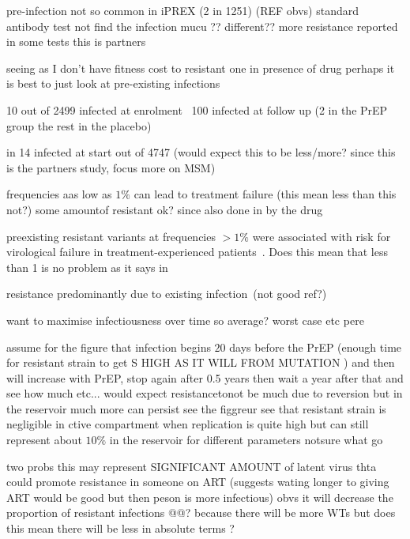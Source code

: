 \documentclass[DIV=15]{scrartcl}
\begin{document}
pre-infection not so common in iPREX (2 in 1251) (REF obvs) standard antibody test not find the infection 
mucu  ?? different??
more resistance reported in some tests \cite{lehman2015} this is partners 

seeing as I don't have fitness cost to resistant one in presence of drug perhaps it is best to just look at pre-existing infections

10 out of 2499 infected at enrolment~\cite{iprex2011}
100 infected at follow up (2 in the PrEP group the rest in the placebo)

in \cite{partners2012} 14 infected at start out of 4747 (would expect this to be less/more? since this is the partners study, focus more on MSM)

frequencies aas low as $1\%$ can lead to treatment failure (this mean less than this not?) some amountof resistant ok? since also done in by the drug

preexisting resistant
variants at frequencies $>1\%$ were associated with risk for virological
failure in treatment-experienced patients~\cite{boltz2011}. Does this mean that less than 1 is no problem as it says in~\cite{lehman2015}

resistance predominantly due to existing infection~\cite{lehman2015}(not good ref?)

want to maximise infectiousness over time so average?
worst case etc pere 

assume for the figure that infection begins 
$20$ days before the PrEP (enough time for resistant strain to get S HIGH AS IT WILL  FROM MUTATION 	)  and then will  increase with PrEP, stop again  after 0.5  years then wait a year after that and see how much etc...      would expect resistancetonot be much due to  reversion but in the reservoir much more can persist see the figgreur
see that resistant strain is negligible in ctive compartment when replication  is quite high but can still  represent about $10\%$ in the reservoir for different parameters notsure  what go 

two  probs this may represent  SIGNIFICANT AMOUNT 	of latent virus thta could promote resistance in someone on ART (suggests wating longer to giving ART would be good but then peson is  more  infectious) obvs it will  decrease the proportion of resistant infections @@? because there will be more  WTs  but does  this mean there will be less in absolute terms ?
\end{document}
